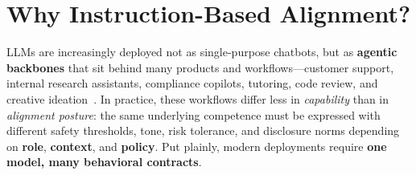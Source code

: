 
\vspace{-2.5em}
\section{Why Instruction-Based Alignment?}
\label{sec:introduction}
\vspace{-0.5em}

LLMs are increasingly deployed not as single-purpose chatbots, but as \textbf{agentic backbones} that sit behind many products and workflows---customer support, internal research assistants, compliance copilots, tutoring, code review, and creative ideation~\cite{brown2020language,openai2023gpt4,touvron2023llama}. In practice, these workflows differ less in \emph{capability} than in \emph{alignment posture}: the same underlying competence must be expressed with different safety thresholds, tone, risk tolerance, and disclosure norms depending on \textbf{role}, \textbf{context}, and \textbf{policy}. Put plainly, modern deployments require \textbf{one model, many behavioral contracts}.








%
%

